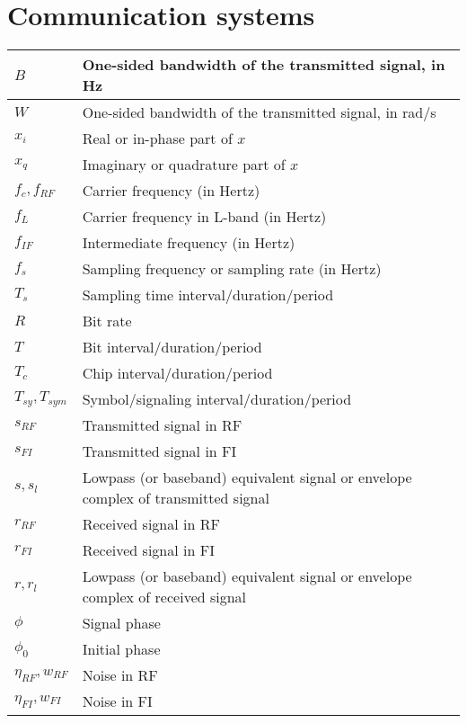 \documentclass{article}
\begin{document}
\section{Communication systems}
\begin{xltabular}{\textwidth}{XX}
    \(B\) & One-sided bandwidth of the transmitted signal, in Hz\\ \hline
    \(W\) & One-sided bandwidth of the transmitted signal, in rad/s\\ \hline
    \(x_i\) & Real or in-phase part of \(x\)\\ \hline
    \(x_q\) & Imaginary or quadrature part of \(x\)\\ \hline
    \(f_c, f_{RF}\) & Carrier frequency (in Hertz)\\ \hline
    \(f_L\) & Carrier frequency in L-band (in Hertz)\\ \hline
    \(f_{IF}\) & Intermediate frequency (in Hertz)\\ \hline
    \(f_{s}\) & Sampling frequency or sampling rate (in Hertz)\\ \hline
    \(T_{s}\) & Sampling time interval/duration/period\\ \hline
    \(R\) & Bit rate\\ \hline
    \(T\) & Bit interval/duration/period\\ \hline
    \(T_c\) & Chip interval/duration/period\\ \hline
    \(T_{sy}, T_{sym}\) & Symbol/signaling\cite{proakisDigitalCommunications2007} interval/duration/period\\ \hline
    \(s_{RF}\) & Transmitted signal in RF\\ \hline
    \(s_{FI}\) & Transmitted signal in FI\\ \hline
    \(s, s_l\) & Lowpass (or baseband) equivalent signal or envelope complex of transmitted signal\\ \hline
    \(r_{RF}\) & Received signal in RF\\ \hline
    \(r_{FI}\) & Received signal in FI\\ \hline
    \(r, r_l\) & Lowpass (or baseband) equivalent signal or envelope complex of received signal\\ \hline
    \(\phi\) & Signal phase\\ \hline
    \(\phi_0\) & Initial phase\\ \hline
    \(\eta_{RF}, w_{RF}\) & Noise in RF\\ \hline
    \(\eta_{FI}, w_{FI}\) & Noise in FI\\ \hline

\end{xltabular}
\end{document}
